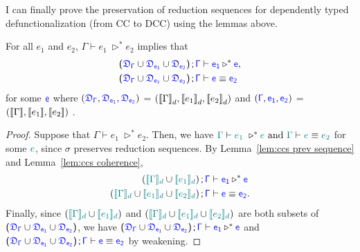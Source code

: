 I can finally prove the preservation of reduction sequences for dependently typed defunctionalization (from CC to DCC) using the lemmas above.

\begin{lemma}
\label{lem:prev sequence}
For all $e_1$ and $e_2$, $\Gamma \vdash e_1\ \triangleright^* e_2$ implies that
\begin{align}
\sfpl \target{\fdef_{\Gamma}} \cup \target{\fdef_{e_1}} \cup \target{\fdef_{e_2}} \sfpr \semicolon \target{\Gamma} &\vdash
\target{e_1} \triangleright^* \target{e},\\
\sfpl \target{\fdef_{\Gamma}} \cup \target{\fdef_{e_1}} \cup \target{\fdef_{e_2}} \sfpr \semicolon \target{\Gamma} &\vdash\target{e} \equiv \target{e_2}
\end{align}
for some $\target{e}$ where
$(\target{\fdef_{\Gamma}}, \target{\fdef_{e_1}}, \target{\fdef_{e_2}})$ = 
$({[\![ \Gamma ]\!]}_d, {[\![ e_1 ]\!]}_d, {[\![ e_2 ]\!]}_d)$ and 
$(\target{\Gamma}, \target{e_1}, \target{e_2})$ = 
$({[\![ \Gamma ]\!]}, {[\![ e_1 ]\!]}, {[\![ e_2 ]\!]})$
.
\begin{proof}
Suppose that $\Gamma \vdash e_1\ \triangleright^* e_2$. Then, we have 
$\color{teal}{\Gamma}\color{black} \vdash \color{teal}{e_1}\color{black}\ \triangleright^* \color{teal}{e}\color{black} \text{ and } \color{teal}{\Gamma}\color{black} \vdash \color{teal}{e}\color{black} \equiv \color{teal}{e_2}\color{black}$ for some $\color{teal}{e}\color{black}$, since $\sigma$ preserves reduction sequences. By Lemma~\ref{lem:ccs prev sequence} and Lemma~\ref{lem:ccs coherence}, 
\begin{align*}
(\hbracketd{\helper{\Gamma}} \cup \hbracketd{\helper{e_1}}) \semicolon \target{\Gamma} &\vdash
\target{e_1} \triangleright^* \target{e}\\
(\hbracketd{\helper{\Gamma}} \cup \hbracketd{\helper{e_1}} \cup \hbracketd{\helper{e_2}}) \semicolon \target{\Gamma} &\vdash \target{e} \equiv \target{e_2}.
\end{align*}
Finally, since $(\color{teal}{[\![}\color{black}{\color{teal}{\Gamma}\color{black}}\color{teal}{]\!]_d}\color{black} \cup \color{teal}{[\![}\color{black}{\color{teal}{e_1}\color{black}}\color{teal}{]\!]_d}\color{black})$ and $(\color{teal}{[\![}\color{black}{\color{teal}{\Gamma}\color{black}}\color{teal}{]\!]_d}\color{black} \cup \color{teal}{[\![}\color{black}{\color{teal}{e_1}\color{black}}\color{teal}{]\!]_d}\color{black} \cup \color{teal}{[\![}\color{black}{\color{teal}{e_2}\color{black}}\color{teal}{]\!]_d}\color{black})$ are both subsets of $\sfpl \target{\fdef_{\Gamma}} \cup \target{\fdef_{e_1}} \cup \target{\fdef_{e_2}} \sfpr$, we have 
$\sfpl \target{\fdef_{\Gamma}} \cup \target{\fdef_{e_1}} \cup \target{\fdef_{e_2}} \sfpr \semicolon \target{\Gamma} \vdash \target{e_1} \triangleright^* \target{e}$ and 
$\sfpl \target{\fdef_{\Gamma}} \cup \target{\fdef_{e_1}} \cup \target{\fdef_{e_2}} \sfpr \semicolon \target{\Gamma} \vdash\target{e} \equiv \target{e_2}$ 
by weakening.
\end{proof}
\end{lemma}


